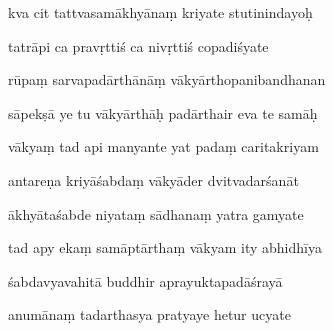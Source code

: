 \documentclass[article,12pt,a4paper]{memoir}%
\newcounter{parCount}
\begin{document}
	  
	  \pstart {} kva cit tattvasamākhyānaṃ kriyate stutinindayoḥ 
	{}
	\pend%
      

	  
	  \pstart \leavevmode%
	tatrāpi ca pravṛttiś ca nivṛttiś copadiśyate 
	{}
	\pend%
      

	  
	  \pstart {} rūpaṃ sarvapadārthānāṃ vākyārthopanibandhanan 
	{}
	\pend%
      

	  
	  \pstart \leavevmode%
	sāpekṣā ye tu vākyārthāḥ padārthair eva te samāḥ 
	{}
	\pend%
      

	  
	  \pstart {} vākyaṃ tad api manyante yat padaṃ caritakriyam 
	{}
	\pend%
      

	  
	  \pstart \leavevmode%
	antareṇa kriyāśabdaṃ vākyāder dvitvadarśanāt 
	{}
	\pend%
      

	  
	  \pstart {} ākhyātaśabde niyataṃ sādhanaṃ yatra gamyate 
	{}
	\pend%
      

	  
	  \pstart \leavevmode%
	tad apy ekaṃ samāptārthaṃ vākyam ity abhidhīya 
	{}
	\pend%
      

	  
	  \pstart {} śabdavyavahitā buddhir aprayuktapadāśrayā 
	{}
	\pend%
      

	  
	  \pstart \leavevmode%
	anumānaṃ tadarthasya pratyaye hetur ucyate 
	{}
	\pend%
      
\end{document}
